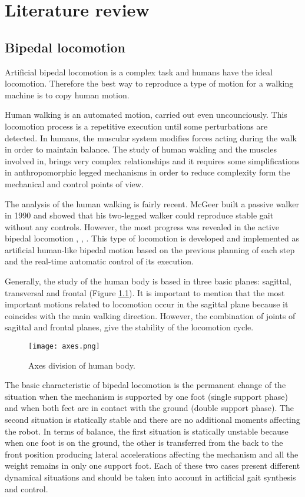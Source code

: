 \chapter{Literature review}



\section{Bipedal locomotion}
Artificial bipedal locomotion is a complex task and humans have the ideal locomotion. Therefore the best way to reproduce a type of motion for a walking machine is to copy human motion.

Human walking is an automated motion, carried out even uncounciously. This locomotion process is a repetitive execution until some perturbations are detected. In humans, the muscular system modifies forces acting during the walk in order to maintain balance. The study of human wakling and the muscles involved in, brings very complex relationships and it requires some simplifications in anthropomorphic legged mechanisms in order to reduce complexity form the mechanical and control points of view.

The analysis of the human walking is fairly recent. McGeer \cite{McGeer1990} built a passive walker in 1990 and showed that his two-legged walker could reproduce stable gait without any controls. However, the most progress was revealed in the active bipedal locomotion \cite{Hirai1998}, \cite{Kaneko2004}, \cite{Park2007}. This type of locomotion is developed and implemented as artificial human-like bipedal motion based on the previous planning of each step and the real-time automatic control of its execution. 

Generally, the study of the human body is based in three basic planes: sagittal, transversal and frontal (Figure \ref{fig:axes}). It is important to mention that the most important motions related to locomotion occur in the sagittal plane because it coincides with the main walking direction. However, the combination of joints of sagittal and frontal planes, give the stability of the locomotion cycle.

\begin{figure}[!h]
\centering
\texttt{[image: axes.png]}
\caption{Axes division of human body.}
\label{fig:axes}
\end{figure}

The basic characteristic of bipedal locomotion is the permanent change of the situation when the mechanism is supported by one foot (single support phase) and when both feet are in contact with the ground (double support phase). The second situation is statically stable and there are no additional moments affecting the robot. In terms of balance, the first situation is statically unstable because when one foot is on the ground, the other is transferred from the back to the front position producing lateral accelerations affecting the mechanism and all the weight remains in only one support foot. Each of these two cases present different dynamical situations and should be taken into account in artificial gait synthesis and control.

